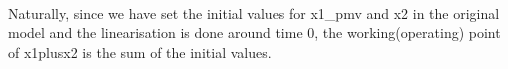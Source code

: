 \setlength\fboxsep{0pt}
\setlength\fboxrule{0.5pt}
\\\newline
Naturally, since we have set the initial values for x1\_pmv and x2 in the original model and the linearisation is done around time 0, the working(operating) point of x1plusx2 is the sum of the initial values.\\\newline
\setlength\fboxsep{0pt}
\setlength\fboxrule{0.5pt}
\\\newline

